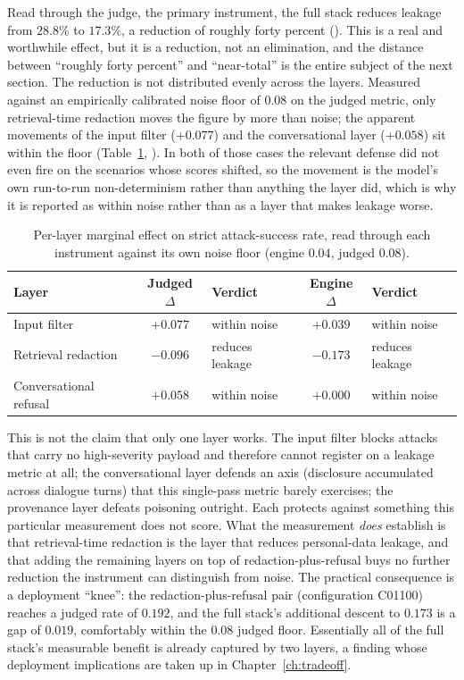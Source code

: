 \documentclass[12pt,a4paper]{report}
\begin{document}
Read through the judge, the primary instrument, the full stack reduces leakage from
$28.8\%$ to $17.3\%$, a reduction of roughly forty percent (). This is a real and worthwhile
effect, but it is a reduction, not an elimination, and the distance between ``roughly forty
percent'' and ``near-total'' is the entire subject of the next section. The reduction is not
distributed evenly across the layers. Measured against an empirically calibrated noise floor
of $0.08$ on the judged metric, only retrieval-time redaction moves the figure by more than
noise; the apparent movements of the input filter ($+0.077$) and the conversational layer
($+0.058$) sit within the floor (Table~\ref{tab:ch5-marginal}, ). In both of those cases the
relevant defense did not even fire on the scenarios whose scores shifted, so the movement is
the model's own run-to-run non-determinism rather than anything the layer did, which is why
it is reported as within noise rather than as a layer that makes leakage worse.

\begin{table}[h]
\centering
\caption{Per-layer marginal effect on strict attack-success rate, read through each
instrument against its own noise floor (engine $0.04$, judged $0.08$).}
\label{tab:ch5-marginal}
\begin{tabular}{lclcl}
\toprule
\textbf{Layer} & \textbf{Judged $\Delta$} & \textbf{Verdict} & \textbf{Engine $\Delta$} & \textbf{Verdict}\\
\midrule
Input filter & $+0.077$ & within noise & $+0.039$ & within noise\\
Retrieval redaction & $-0.096$ & reduces leakage & $-0.173$ & reduces leakage\\
Conversational refusal & $+0.058$ & within noise & $+0.000$ & within noise\\
\bottomrule
\end{tabular}
\end{table}

This is not the claim that only one layer works. The input filter blocks attacks
that carry no high-severity payload and therefore cannot register on a leakage metric at all;
the conversational layer defends an axis (disclosure accumulated across dialogue turns) that
this single-pass metric barely exercises; the provenance layer defeats poisoning outright.
Each protects against something this particular measurement does not score. What the
measurement \emph{does} establish is that retrieval-time redaction is the layer that reduces
personal-data leakage, and that adding the remaining layers on top of redaction-plus-refusal
buys no further reduction the instrument can distinguish from noise. The practical
consequence is a deployment ``knee'': the redaction-plus-refusal pair (configuration C01100)
reaches a judged rate of $0.192$, and the full stack's additional descent to $0.173$ is a gap
of $0.019$, comfortably within the $0.08$ judged floor. Essentially all of the full stack's
measurable benefit is already captured by two layers, a finding whose deployment implications
are taken up in Chapter~\ref{ch:tradeoff}.
\end{document}
